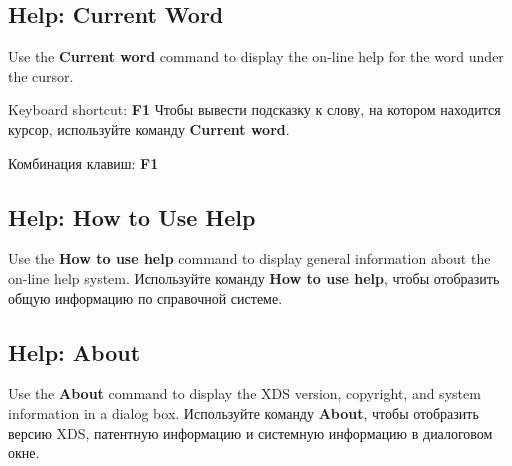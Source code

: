 \subsection{Help: Current Word}

\ifenglish
Use the {\bf Current word} command to display the on-line
help for the word under the cursor.

Keyboard shortcut: {\bf F1}
\else
Чтобы вывести подсказку к слову, на котором находится курсор, используйте
команду {\bf Current word}.

Комбинация клавиш: {\bf F1}
\fi
\subsection{Help: How to Use Help}

\ifenglish
Use the {\bf How to use help} command to display general
information about the on-line help system.
\else
Используйте команду {\bf How to use help}, чтобы отобразить общую
информацию по справочной системе.
\fi
\subsection{Help: About}

\ifenglish
Use the {\bf About} command to display the XDS version,
copyright, and system information in a dialog box.
\else
Используйте команду {\bf About}, чтобы отобразить версию XDS,
патентную информацию и системную информацию в диалоговом окне.
\fi